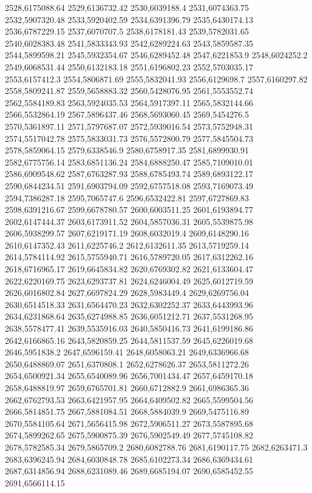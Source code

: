 2528,6175088.64
2529,6136732.42
2530,6039188.4
2531,6074363.75
2532,5907320.48
2533,5920402.59
2534,6391396.79
2535,6430174.13
2536,6787229.15
2537,6070707.5
2538,6178181.43
2539,5782031.65
2540,6028383.48
2541,5833343.93
2542,6289224.63
2543,5859587.35
2544,5899598.21
2545,5932354.67
2546,6289452.48
2547,6221853.9
2548,6024252.2
2549,6068531.44
2550,6132183.18
2551,6196802.23
2552,5703035.17
2553,6157412.3
2554,5806871.69
2555,5832041.93
2556,6129698.7
2557,6160297.82
2558,5809241.87
2559,5658883.32
2560,5428076.95
2561,5553552.74
2562,5584189.83
2563,5924035.53
2564,5917397.11
2565,5832144.66
2566,5532864.19
2567,5896437.46
2568,5693060.45
2569,5454276.5
2570,5361897.11
2571,5797687.07
2572,5939016.54
2573,5752948.31
2574,5517042.78
2575,5833031.73
2576,5572800.79
2577,5845504.73
2578,5859064.15
2579,6338546.9
2580,6758917.35
2581,6899930.91
2582,6775756.14
2583,6851136.24
2584,6888250.47
2585,7109010.01
2586,6909548.62
2587,6763287.93
2588,6785493.74
2589,6893122.17
2590,6844234.51
2591,6903794.09
2592,6757518.08
2593,7169073.49
2594,7386287.18
2595,7065747.6
2596,6532422.81
2597,6727869.83
2598,6391216.67
2599,6678780.57
2600,6003511.25
2601,6193894.77
2602,6147444.37
2603,6173911.52
2604,5857036.31
2605,5539875.98
2606,5938299.57
2607,6219171.19
2608,6032019.4
2609,6148290.16
2610,6147352.43
2611,6225746.2
2612,6132611.35
2613,5719259.14
2614,5784114.92
2615,5755940.71
2616,5789720.05
2617,6312262.16
2618,6716965.17
2619,6645834.82
2620,6769302.82
2621,6133604.47
2622,6220169.75
2623,6293737.81
2624,6246004.49
2625,6012719.59
2626,6016802.84
2627,6697824.29
2628,5983449.4
2629,6269756.04
2630,6514518.33
2631,6564470.23
2632,6302252.37
2633,6443993.96
2634,6231868.64
2635,6274988.85
2636,6051212.71
2637,5531268.95
2638,5578477.41
2639,5535916.03
2640,5850416.73
2641,6199186.86
2642,6166865.16
2643,5820859.25
2644,5811537.59
2645,6226019.68
2646,5951838.2
2647,6596159.41
2648,6058063.21
2649,6336966.68
2650,6488869.07
2651,6370808.1
2652,6278626.37
2653,5811272.26
2654,6500921.34
2655,6540089.96
2656,7001434.47
2657,6459170.18
2658,6488819.97
2659,6765701.81
2660,6712882.9
2661,6986365.36
2662,6762793.53
2663,6421957.95
2664,6409502.82
2665,5599504.56
2666,5814851.75
2667,5881084.51
2668,5884039.9
2669,5475116.89
2670,5584105.64
2671,5656415.98
2672,5906511.27
2673,5587895.68
2674,5899262.65
2675,5900875.39
2676,5902549.49
2677,5745108.82
2678,5782585.34
2679,5865709.2
2680,6082788.76
2681,6190117.75
2682,6263471.3
2683,6396245.94
2684,6030848.78
2685,6102273.34
2686,6369434.61
2687,6314856.94
2688,6231089.46
2689,6685194.07
2690,6585452.55
2691,6566114.15
